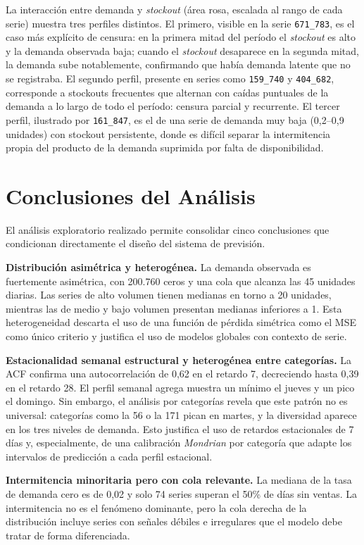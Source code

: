 La interacción entre demanda y \textit{stockout} (área rosa, escalada al rango de cada serie) muestra tres perfiles distintos. El primero, visible en la serie \texttt{671\_783}, es el caso más explícito de censura: en la primera mitad del período el \textit{stockout} es alto y la demanda observada baja; cuando el \textit{stockout} desaparece en la segunda mitad, la demanda sube notablemente, confirmando que había demanda latente que no se registraba. El segundo perfil, presente en series como \texttt{159\_740} y \texttt{404\_682}, corresponde a stockouts frecuentes que alternan con caídas puntuales de la demanda a lo largo de todo el período: censura parcial y recurrente. El tercer perfil, ilustrado por \texttt{161\_847}, es el de una serie de demanda muy baja (0,2--0,9 unidades) con stockout persistente, donde es difícil separar la intermitencia propia del producto de la demanda suprimida por falta de disponibilidad.

\section{Conclusiones del Análisis}

El análisis exploratorio realizado permite consolidar cinco conclusiones que condicionan directamente el diseño del sistema de previsión.

\textbf{Distribución asimétrica y heterogénea.} La demanda observada es fuertemente asimétrica, con 200.760 ceros y una cola que alcanza las 45 unidades diarias. Las series de alto volumen tienen medianas en torno a 20 unidades, mientras las de medio y bajo volumen presentan medianas inferiores a 1. Esta heterogeneidad descarta el uso de una función de pérdida simétrica como el MSE como único criterio y justifica el uso de modelos globales con contexto de serie.

\textbf{Estacionalidad semanal estructural y heterogénea entre categorías.} La ACF confirma una autocorrelación de 0,62 en el retardo 7, decreciendo hasta 0,39 en el retardo 28. El perfil semanal agrega muestra un mínimo el jueves y un pico el domingo. Sin embargo, el análisis por categorías revela que este patrón no es universal: categorías como la 56 o la 171 pican en martes, y la diversidad aparece en los tres niveles de demanda. Esto justifica el uso de retardos estacionales de 7 días y, especialmente, de una calibración \textit{Mondrian} por categoría que adapte los intervalos de predicción a cada perfil estacional.

\textbf{Intermitencia minoritaria pero con cola relevante.} La mediana de la tasa de demanda cero es de 0,02 y solo 74 series superan el 50\% de días sin ventas. La intermitencia no es el fenómeno dominante, pero la cola derecha de la distribución incluye series con señales débiles e irregulares que el modelo debe tratar de forma diferenciada.

